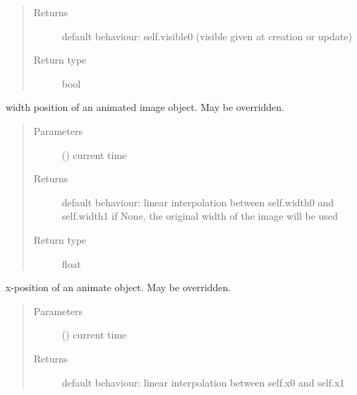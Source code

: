 \documentclass[letterpaper,10pt,english]{sphinxmanual}
\begin{document}
\begin{fulllineitems}
\begin{fulllineitems}
\begin{quote}
\begin{description}
\item[{Returns}] \leavevmode
{} \textendash{} default behaviour: self.visible0 (visible given at creation or update)

\item[{Return type}] \leavevmode
bool

\end{description}\end{quote}

\end{fulllineitems}


\begin{fulllineitems}
\label{\detokenize{Reference:salabim.Animate.width}}
width position of an animated image object. May be overridden.
\begin{quote}\begin{description}
\item[{Parameters}] \leavevmode
{} () \textendash{} current time

\item[{Returns}] \leavevmode
{} \textendash{} default behaviour: linear interpolation between self.width0 and self.width1 
if None, the original width of the image will be used

\item[{Return type}] \leavevmode
float

\end{description}\end{quote}

\end{fulllineitems}


\begin{fulllineitems}
\label{\detokenize{Reference:salabim.Animate.x}}
x-position of an animate object. May be overridden.
\begin{quote}\begin{description}
\item[{Parameters}] \leavevmode
{} () \textendash{} current time

\item[{Returns}] \leavevmode
{} \textendash{} default behaviour: linear interpolation between self.x0 and self.x1


\end{description}
\end{quote}
\end{fulllineitems}
\end{fulllineitems}
\end{document}

